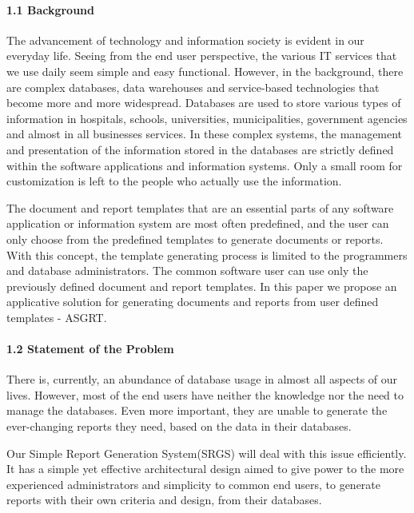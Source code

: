 \documentclass[10pt,a4paper]{report}
\begin{document}
\paragraph{1.1  Background}
\begin{flushleft}
The advancement of technology and information society is evident in our everyday life. Seeing from the end user perspective, the various IT services that we use daily seem simple and easy functional. However, in the background, there are complex databases, data warehouses and service-based technologies that become more and more widespread. Databases are used to store various types of information in hospitals, schools, universities, municipalities, government agencies and almost in all businesses services. In these complex systems, the management and presentation of the information stored in the databases are strictly defined within the software applications and information systems. Only a small room for customization is left to the people who actually use the information.
\end{flushleft}

\begin{flushleft}
The document and report templates that are an essential parts of any software
application or information system are most often predefined, and the user can only
choose from the predefined templates to generate documents or reports. With this
concept, the template generating process is limited to the programmers and database
administrators. The common software user can use only the previously defined
document and report templates. In this paper we propose an applicative solution for
generating documents and reports from user defined templates - ASGRT. 
\end{flushleft}

\paragraph{1.2  Statement of the Problem}
\begin{flushleft}
There is, currently, an abundance of database usage
in almost all aspects of our lives. However, most of the end users have neither the
knowledge nor the need to manage the databases. Even more important, they are
unable to generate the ever-changing reports they need, based on the data in their
databases. 
\end{flushleft}

\begin{flushleft}
Our Simple Report Generation System(SRGS) will deal with this issue efficiently. It has a simple yet effective architectural design aimed to give power to the more experienced administrators and simplicity to common end users, to generate reports with their own criteria and design, from their databases.
\end{flushleft}
\end{document}
